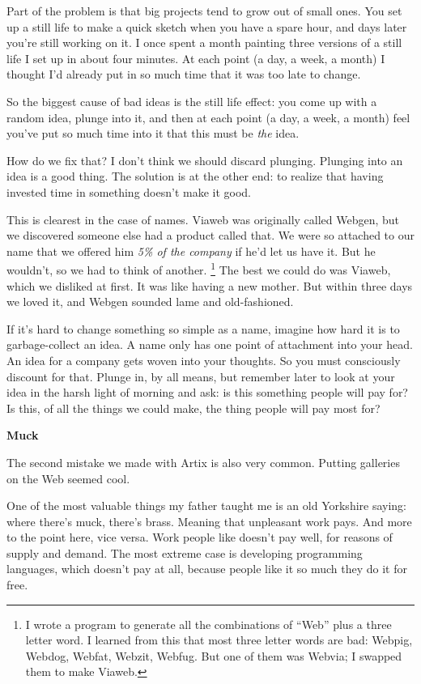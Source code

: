 Part of the problem is that big projects tend to grow out of small ones.
You set up a still life to make a quick sketch when you have a spare
hour, and days later you're still working on it. I once spent a month
painting three versions of a still life I set up in about four minutes.
At each point (a day, a week, a month) I thought I'd already put in so
much time that it was too late to change.

So the biggest cause of bad ideas is the still life effect: you come up
with a random idea, plunge into it, and then at each point (a day, a
week, a month) feel you've put so much time into it that this must be
\emph{the} idea.

How do we fix that? I don't think we should discard plunging. Plunging
into an idea is a good thing. The solution is at the other end: to
realize that having invested time in something doesn't make it good.

This is clearest in the case of names. Viaweb was originally called
Webgen, but we discovered someone else had a product called that. We
were so attached to our name that we offered him \emph{5\% of the
company} if he'd let us have it. But he wouldn't, so we had to think of
another. \footnote{I wrote a program to generate all the combinations of ``Web''
plus a three letter word. I learned from this that most three letter
words are bad: Webpig, Webdog, Webfat, Webzit, Webfug. But one of them
was Webvia; I swapped them to make Viaweb.} The best we could do was Viaweb, which
we disliked at first. It was like having a new mother. But within three
days we loved it, and Webgen sounded lame and old-fashioned.

If it's hard to change something so simple as a name, imagine how hard
it is to garbage-collect an idea. A name only has one point of
attachment into your head. An idea for a company gets woven into your
thoughts. So you must consciously discount for that. Plunge in, by all
means, but remember later to look at your idea in the harsh light of
morning and ask: is this something people will pay for? Is this, of all
the things we could make, the thing people will pay most for?

\textbf{Muck}

The second mistake we made with Artix is also very common. Putting
galleries on the Web seemed cool.

One of the most valuable things my father taught me is an old Yorkshire
saying: where there's muck, there's brass. Meaning that unpleasant work
pays. And more to the point here, vice versa. Work people like doesn't
pay well, for reasons of supply and demand. The most extreme case is
developing programming languages, which doesn't pay at all, because
people like it so much they do it for free.

